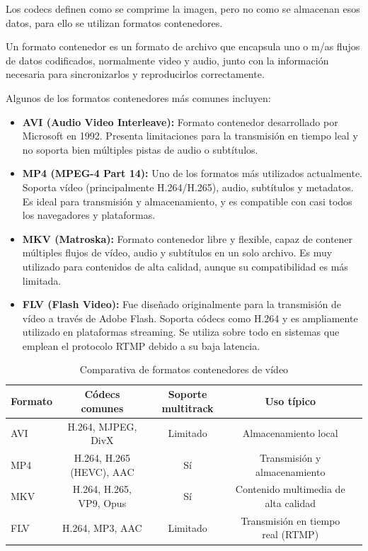 Los codecs definen como se comprime la imagen, pero no como se almacenan esos datos, para ello se utilizan formatos contenedores.

Un formato contenedor es un formato de archivo que encapsula uno o m/as flujos de datos codificados, normalmente video y audio, junto con la información necesaria para sincronizarlos y reproducirlos correctamente.

Algunos de los formatos contenedores más comunes incluyen:

\begin{itemize}
    \item \textbf{AVI (Audio Video Interleave):} Formato contenedor desarrollado por Microsoft en 1992.
    Presenta limitaciones para la transmisión en tiempo leal y no soporta bien múltiples pistas de audio o subtítulos.

    \item \textbf{MP4 (MPEG-4 Part 14):} Uno de los formatos más utilizados actualmente.
    Soporta vídeo (principalmente H.264/H.265), audio, subtítulos y metadatos.
    Es ideal para transmisión y almacenamiento, y es compatible con casi todos los navegadores y plataformas.

    \item \textbf{MKV (Matroska):} Formato contenedor libre y flexible, capaz de contener múltiples flujos de vídeo, audio y subtítulos en un solo archivo.
    Es muy utilizado para contenidos de alta calidad, aunque su compatibilidad es más limitada.

    \item \textbf{FLV (Flash Video):} Fue diseñado originalmente para la transmisión de vídeo a través de Adobe Flash.
    Soporta códecs como H.264 y es ampliamente utilizado en plataformas streaming.
    Se utiliza sobre todo en sistemas que emplean el protocolo RTMP debido a su baja latencia.
\end{itemize}

\begin{table}[h]
    \centering
    \footnotesize
    \begin{tabular}{|l|c|c|c|c|}
        \hline
        \textbf{Formato} & \textbf{Códecs comunes}  & \textbf{Soporte multitrack} & \textbf{Uso típico}                  \\
        \hline
        AVI              & H.264, MJPEG, DivX       & Limitado                    & Almacenamiento local                 \\
        \hline
        MP4              & H.264, H.265 (HEVC), AAC & Sí                          & Transmisión y almacenamiento         \\
        \hline
        MKV              & H.264, H.265, VP9, Opus  & Sí                          & Contenido multimedia de alta calidad \\
        \hline
        FLV              & H.264, MP3, AAC          & Limitado                    & Transmisión en tiempo real (RTMP)    \\
        \hline
    \end{tabular}
    \caption{Comparativa de formatos contenedores de vídeo}
    \label{tab:video_containers}
\end{table}


